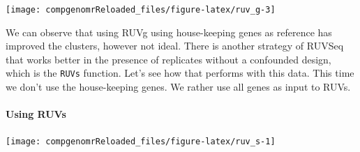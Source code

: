\documentclass[12pt,]{krantz}
\newenvironment{Shaded}{\begin{snugshade}}{\end{snugshade}}
\newcommand{\CommentTok}[1]{\textcolor[rgb]{0.56,0.35,0.01}{\textit{#1}}}
\newcommand{\ControlFlowTok}[1]{\textcolor[rgb]{0.13,0.29,0.53}{\textbf{#1}}}
\newcommand{\DataTypeTok}[1]{\textcolor[rgb]{0.13,0.29,0.53}{#1}}
\newcommand{\DecValTok}[1]{\textcolor[rgb]{0.00,0.00,0.81}{#1}}
\newcommand{\FloatTok}[1]{\textcolor[rgb]{0.00,0.00,0.81}{#1}}
\newcommand{\KeywordTok}[1]{\textcolor[rgb]{0.13,0.29,0.53}{\textbf{#1}}}
\newcommand{\NormalTok}[1]{#1}
\newcommand{\OperatorTok}[1]{\textcolor[rgb]{0.81,0.36,0.00}{\textbf{#1}}}
\newcommand{\StringTok}[1]{\textcolor[rgb]{0.31,0.60,0.02}{#1}}
\let\oldparagraph\paragraph
\renewcommand{\paragraph}[1]{\oldparagraph{#1}\mbox{}}
\begin{document}
\begin{center}\texttt{[image: compgenomrReloaded\_files/figure-latex/ruv\_g-3]} \end{center}

We can observe that using RUVg using house-keeping genes as reference has improved the clusters, however not ideal. There is another strategy of RUVSeq that works better in the presence of replicates without a confounded design, which is the \texttt{RUVs} function. Let's see how that performs with this data. This time we don't use the house-keeping genes. We rather use all genes as input to RUVs.

\hypertarget{using-ruvs}{%
\paragraph{Using RUVs}\label{using-ruvs}}

\begin{Shaded}
\end{Shaded}

\begin{center}\texttt{[image: compgenomrReloaded\_files/figure-latex/ruv\_s-1]} \end{center}
\end{document}
